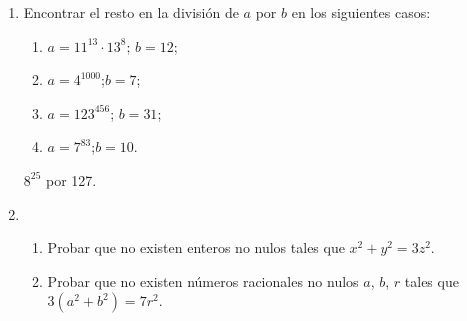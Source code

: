 \documentclass[a4paper,12pt,twoside,spanish,reqno]{amsbook}
\numberwithin{equation}{section}
\begin{document}
\begin{enumerate}
\item Encontrar el resto en la divisi\'on de $a$ por $b$ en los siguientes casos:
\begin{multicols}{2}
 \begin{enumerate}
\item $a=11^{13}\cdot 13^8$; \quad $b=12$;
\item $a=4^{1000}$;\quad $b=7$;
\item $a=123^{456}$; \quad  $b=31$;
\item $a=7^{83}$;\quad  $b=10$.
\end{enumerate}
\end{multicols}

 $8^{25}$ por 127.


%




%

\item \begin{enumerate}
\item Probar que no existen enteros no nulos tales que $x^2 + y^2 = 3z^2$.
\item Probar que no existen n\'umeros racionales no nulos $a$, $b$, $r$ tales que $3(a^2 + b^2) = 7r^2$.
\end{enumerate}




\end{enumerate}
\end{document}
